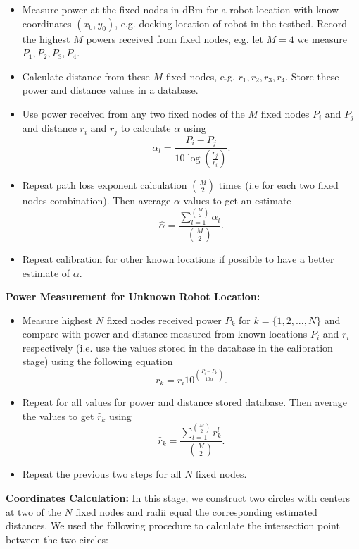 \documentclass[journal]{IEEEtran} 				\IEEEoverridecommandlockouts 						\usepackage{amsmath,amssymb}
\begin{document}
    \begin{itemize}
      \item Measure power at the fixed nodes in dBm for a robot location with know coordinates $(x_0,y_0)$, e.g. docking location of robot in the testbed. Record the highest $M$ powers received from fixed nodes, e.g. let $M=4$ we measure $P_1,P_2,P_3,P_4$.
      \item Calculate distance from these $M$ fixed nodes, e.g. $r_1,r_2,r_3,r_4$. Store these power and distance values in a database.
      \item Use power received from any two fixed nodes of the $M$ fixed nodes $P_i$ and $P_j$ and distance $r_i$ and $r_j$ to calculate $\alpha$  using
      \begin{equation}
      \alpha_l = \frac{P_i-P_j}{10\log(\frac{r_j}{r_i})}.
      \end{equation}
      \item Repeat path loss exponent calculation $\binom{M}{2}$ times (i.e for each two fixed nodes combination). Then average $\alpha$ values to get an estimate
      \begin{equation}
	  \hat{\alpha}= \frac{\sum_{l=1}^{\binom{M}{2}} \alpha_l }{\binom{M}{2}}.
      \end{equation}
      \item Repeat calibration for other known locations if possible to have a better estimate of $\alpha$.
      \end{itemize}
\textbf{Power Measurement for Unknown Robot Location:}

  \begin{itemize}
  \item Measure highest $N$ fixed nodes received power $P_k$ for $k=\{1,2,...,N\}$ and compare with power and distance measured from known locations $P_i$ and $r_i$ respectively (i.e. use the values stored in the database in the calibration stage) using the following equation
  \begin{equation}
   r_k = r_i 10^{(\frac{P_i-P_k}{10\hat{\alpha}})}.
  \end{equation}
  \item Repeat for all values for power and distance stored database. Then average the values to get $\hat{r}_k$ using
        \begin{equation}
	  \hat{r}_k= \frac{\sum_{l=1}^{\binom{M}{2}} {r}_k^l }{\binom{M}{2}}.
      \end{equation}
  \item Repeat the previous two steps for all $N$ fixed nodes.
  \end{itemize}
\noindent
\textbf{Coordinates Calculation:} In this stage, we construct two circles with centers at two of the $N$ fixed nodes and radii equal the corresponding estimated distances.  We used the following procedure to calculate the intersection point between the two circles:
\end{document}
